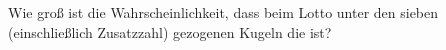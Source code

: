 \documentclass{abgabe}
\begin{document}
\begin{questions}
    \question
    Wie groß ist die Wahrscheinlichkeit, dass beim Lotto  unter den sieben (einschließlich Zusatzzahl) gezogenen Kugeln die  ist?
    \begin{solution}

    \end{solution}
\end{questions}
\end{document}
